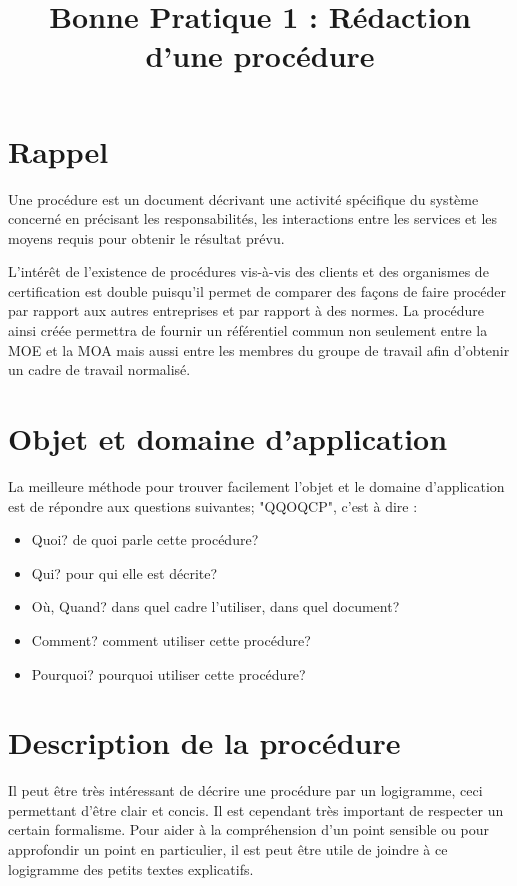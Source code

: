 \documentclass[a4paper]{article}
\begin{document}
\title{Bonne Pratique 1 : Rédaction d'une procédure}
\maketitle

\section{Rappel}

Une procédure est un document décrivant une activité spécifique du système concerné en précisant les responsabilités, les interactions entre les services et les moyens requis pour obtenir le résultat prévu.

L'intérêt de l'existence de procédures vis-à-vis des clients et des organismes de certification est double puisqu'il permet de comparer des façons de faire procéder par rapport aux autres entreprises et par rapport à des normes. La procédure ainsi créée permettra de fournir un référentiel commun non seulement entre la MOE et la MOA mais aussi entre les membres du groupe de travail afin d'obtenir un cadre de travail normalisé.

\section{Objet et domaine d'application}

La meilleure méthode pour trouver facilement l'objet et le domaine d'application est de répondre aux questions suivantes; "QQOQCP", c'est à dire :

\begin{itemize}
\item Quoi? de quoi parle cette procédure?
\item Qui? pour qui elle est décrite?
\item Où, Quand? dans quel cadre l'utiliser, dans quel document?
\item Comment? comment utiliser cette procédure?
\item Pourquoi? pourquoi utiliser cette procédure?
\end{itemize}

\section{Description de la procédure}

Il peut être très intéressant de décrire une procédure par un logigramme, ceci permettant d'être clair et concis. Il est cependant très important de respecter un certain formalisme. Pour aider à la compréhension d'un point sensible ou pour approfondir un point en particulier, il est peut être utile de joindre à ce logigramme des petits textes explicatifs.
\end{document}
